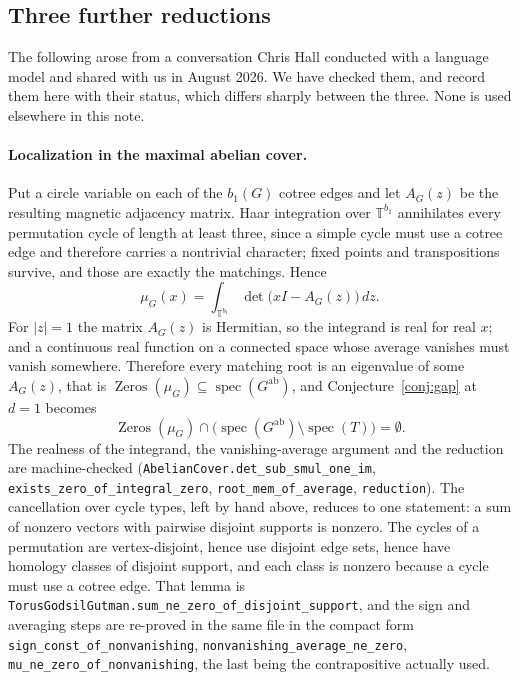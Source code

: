 \documentclass[11pt]{article}
\theoremstyle{remark}
\begin{document}
\subsection{Three further reductions}\label{sec:further}

The following arose from a conversation Chris Hall conducted with a language model and
shared with us in August 2026. We have checked them, and record them here with their
status, which differs sharply between the three. None is used elsewhere in this note.

\paragraph{Localization in the maximal abelian cover.}
Put a circle variable on each of the $b_1(G)$ cotree edges and let $A_G(z)$ be the
resulting magnetic adjacency matrix. Haar integration over $\mathbb T^{b_1}$ annihilates
every permutation cycle of length at least three, since a simple cycle must use a cotree
edge and therefore carries a nontrivial character; fixed points and transpositions survive,
and those are exactly the matchings. Hence
\[
\mu_G(x)=\int_{\mathbb T^{b_1}}\det\bigl(xI-A_G(z)\bigr)\,dz .
\]
For $|z|=1$ the matrix $A_G(z)$ is Hermitian, so the integrand is real for real $x$; and a
continuous real function on a connected space whose average vanishes must vanish somewhere.
Therefore every matching root is an eigenvalue of some $A_G(z)$, that is
$\operatorname{Zeros}(\mu_G)\subseteq\operatorname{spec}(G^{\mathrm{ab}})$, and
Conjecture~\ref{conj:gap} at $d=1$ becomes
\[
\operatorname{Zeros}(\mu_G)\cap\bigl(\operatorname{spec}(G^{\mathrm{ab}})\setminus
\operatorname{spec}(T)\bigr)=\emptyset .
\]
The realness of the integrand, the vanishing-average argument and the reduction are
machine-checked (\texttt{AbelianCover.det\_sub\_smul\_one\_im},
\texttt{exists\_zero\_of\_integral\_zero}, \texttt{root\_mem\_of\_average},
\texttt{reduction}). The cancellation over cycle types, left by hand above, reduces to one
statement: a sum of nonzero vectors with pairwise disjoint supports is nonzero. The cycles of
a permutation are vertex-disjoint, hence use disjoint edge sets, hence have homology classes
of disjoint support, and each class is nonzero because a cycle must use a cotree edge. That
lemma is \texttt{TorusGodsilGutman.sum\_ne\_zero\_of\_disjoint\_support}, and the sign and
averaging steps are re-proved in the same file in the compact form
\texttt{sign\_const\_of\_nonvanishing}, \texttt{nonvanishing\_average\_ne\_zero},
\texttt{mu\_ne\_zero\_of\_nonvanishing}, the last being the contrapositive actually used.
\end{document}
